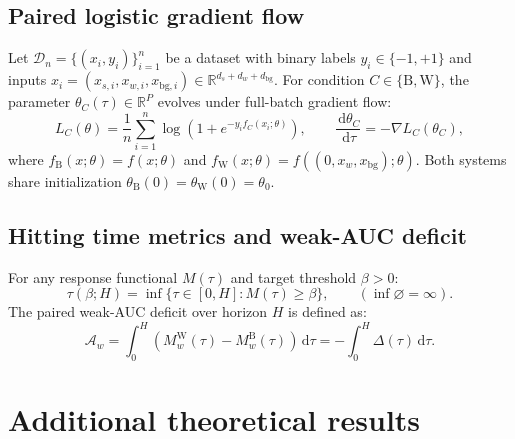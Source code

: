 \documentclass{article}
\theoremstyle{definition}
\theoremstyle{remark}
\newcommand{\R}{\mathbb{R}}
\newcommand{\Bcond}{\mathrm{B}}
\newcommand{\Wcond}{\mathrm{W}}
\newcommand{\dd}{\,\mathrm{d}}
\begin{document}
\subsection{Paired logistic gradient flow}
Let $\mathcal{D}_n = \{(x_i, y_i)\}_{i=1}^n$ be a dataset with binary labels $y_i \in \{-1, +1\}$ and inputs $x_i = (x_{s,i}, x_{w,i}, x_{\text{bg},i}) \in \R^{d_s + d_w + d_{\text{bg}}}$.
For condition $C \in \{\Bcond, \Wcond\}$, the parameter $\theta_C(\tau) \in \R^P$ evolves under full-batch gradient flow:
\begin{equation}
  L_C(\theta) = \frac{1}{n} \sum_{i=1}^n \log\left(1 + e^{-y_i f_C(x_i; \theta)}\right), \qquad \frac{\dd \theta_C}{\dd \tau} = -\nabla L_C(\theta_C),
  \label{eq:app-flow}
\end{equation}
where $f_{\Bcond}(x; \theta) = f(x; \theta)$ and $f_{\Wcond}(x; \theta) = f((0, x_w, x_{\text{bg}}); \theta)$. Both systems share initialization $\theta_{\Bcond}(0) = \theta_{\Wcond}(0) = \theta_0$.

\subsection{Hitting time metrics and weak-AUC deficit}
For any response functional $M(\tau)$ and target threshold $\beta > 0$:
\begin{equation}
  \tau(\beta; H) = \inf\{\tau \in [0, H] : M(\tau) \ge \beta\}, \qquad (\inf \varnothing = \infty).
  \label{eq:app-hitting}
\end{equation}
The paired weak-AUC deficit over horizon $H$ is defined as:
\begin{equation}
  \mathcal{A}_w = \int_0^H \left(M_w^{\Wcond}(\tau) - M_w^{\Bcond}(\tau)\right) \dd \tau = -\int_0^H \Delta(\tau) \dd \tau.
  \label{eq:app-auc}
\end{equation}

\section{Additional theoretical results}
\label{app:theory}
\setcounter{equation}{0}
\setcounter{theorem}{0}
\setcounter{table}{0}
\setcounter{figure}{0}
\end{document}
